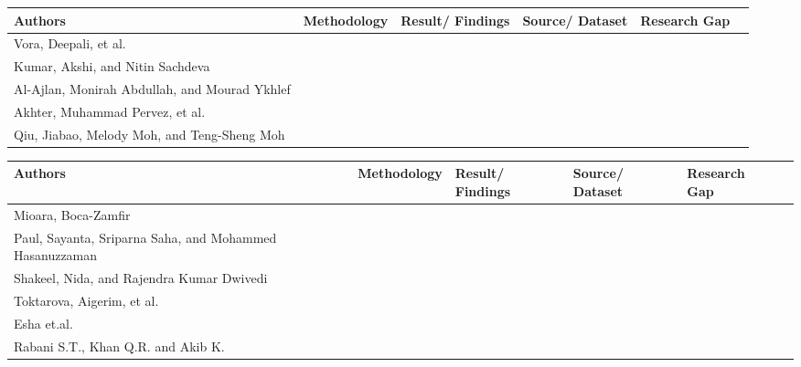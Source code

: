{\begin{tabular}{|p{1.5cm}|p{2.5cm}|p{2.5cm}|p{2.5cm}|p{2.5cm}|p{2.5cm}|}
\hline
\textbf{Authors} & \textbf{Methodology} & \textbf{Result/ Findings} & \textbf{Source/ Dataset} & \textbf{Research Gap} \\
\hline
Vora, Deepali, et al. \cite{bib11} &  &  &  &  \\
\hline
Kumar, Akshi, and Nitin Sachdeva \cite{bib12} &  &  &  &  \\
\hline
Al-Ajlan, Monirah Abdullah, and Mourad Ykhlef \cite{bib13} &  &  &  &  \\
\hline
Akhter, Muhammad Pervez, et al. \cite{bib14} &  &  &  &  \\
\hline
Qiu, Jiabao, Melody Moh, and Teng-Sheng Moh \cite{bib15} &  &  &  &  \\
\hline
\end{tabular}

\begin{tabular}{|p{1.5cm}|p{2.5cm}|p{2.5cm}|p{2.5cm}|p{2.5cm}|p{2.5cm}|}
\hline
\textbf{Authors} & \textbf{Methodology} & \textbf{Result/ Findings} & \textbf{Source/ Dataset} & \textbf{Research Gap} \\
\hline
Mioara, Boca-Zamfir \cite{bib16} &  &  &  &  \\
\hline
Paul, Sayanta, Sriparna Saha, and Mohammed Hasanuzzaman \cite{bib17} &  &  &  &  \\
\hline
Shakeel, Nida, and Rajendra Kumar Dwivedi\cite{bib18} &  &  &  &  \\
\hline
Toktarova, Aigerim, et al.\cite{bib19} &  &  &  &  \\
\hline
Esha et.al.\cite{bib20} &  &  &  &  \\
\hline
Rabani S.T., Khan Q.R. and Akib K.\cite{bib21} &  &  &  &  \\
\hline
\end{tabular}
}
\bigskip